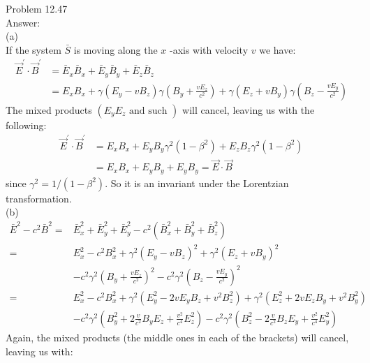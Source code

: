 \documentclass[UTF8]{ctexart}
\begin{document}
	Problem 12.47\\
	Answer:\\
	(a)\\
	If the system $\bar{S}$ is moving along the $x$ -axis with velocity $v$ we have:\\
	$$\begin{aligned}
	\vec{E}^{\prime} \cdot \vec{B}^{\prime} &=\bar{E}_{x} \bar{B}_{x}+\bar{E}_{y} \bar{B}_{y}+\bar{E}_{z} \bar{B}_{z} \\
	&=E_{x} B_{x}+\gamma\left(E_{y}-v B_{z}\right) \gamma\left(B_{y}+\frac{v E_{z}}{c^{2}}\right)+\gamma\left(E_{z}+v B_{y}\right) \gamma\left(B_{z}-\frac{v E_{y}}{c^{2}}\right)
	\end{aligned}$$
	The mixed products $\left(E_{y} E_{z} \text { and such }\right)$ will cancel, leaving us with the following:\\
	$$\begin{aligned}
		\vec{E}^{\prime} \cdot \vec{B}^{\prime} &=E_{x} B_{x}+E_{y} B_{y} \gamma^{2}\left(1-\beta^{2}\right)+E_{z} B_{z} \gamma^{2}\left(1-\beta^{2}\right) \\
		&=E_{x} B_{x}+E_{y} B_{y}+E_{y} B_{y}=\vec{E} \cdot \vec{B}
	\end{aligned}$$
	since $\gamma^{2}=1 /\left(1-\beta^{2}\right) .$ So it is an invariant under the Lorentzian transformation.\\
	(b)\\
	$$\begin{aligned}
	\bar{E}^{2}-c^{2} \bar{B}^{2}=& \bar{E}_{x}^{2}+\bar{E}_{y}^{2}+\bar{E}_{y}^{2}-c^{2}\left(\bar{B}_{x}^{2}+\bar{B}_{y}^{2}+\bar{B}_{z}^{2}\right) \\
	=& E_{x}^{2}-c^{2} B_{x}^{2}+\gamma^{2}\left(E_{y}-v B_{z}\right)^{2}+\gamma^{2}\left(E_{z}+v B_{y}\right)^{2} \\
	&-c^{2} \gamma^{2}\left(B_{y}+\frac{v E_{z}}{c^{2}}\right)^{2}-c^{2} \gamma^{2}\left(B_{z}-\frac{v E_{y}}{c^{2}}\right)^{2} \\
	=& E_{x}^{2}-c^{2} B_{x}^{2}+\gamma^{2}\left(E_{y}^{2}-2 v E_{y} B_{z}+v^{2} B_{z}^{2}\right)+\gamma^{2}\left(E_{z}^{2}+2 v E_{z} B_{y}+v^{2} B_{y}^{2}\right) \\
	&-c^{2} \gamma^{2}\left(B_{y}^{2}+2 \frac{v}{c^{2}} B_{y} E_{z}+\frac{v^{2}}{c^{4}} E_{z}^{2}\right)-c^{2} \gamma^{2}\left(B_{z}^{2}-2 \frac{v}{c^{2}} B_{z} E_{y}+\frac{v^{2}}{c^{4}} E_{y}^{2}\right)
	\end{aligned}$$
	Again, the mixed products (the middle ones in each of the brackets) will cancel, leaving us with:\\
\end{document}

